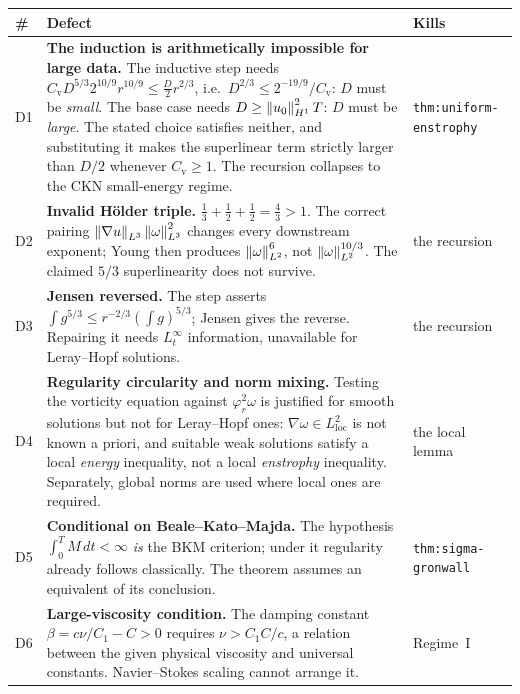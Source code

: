 \begin{table}[ht]
\centering
\footnotesize
\begin{tabular}{@{}l p{} l@{}}
\toprule
\# & Defect & Kills \\
\midrule
D1 & \textbf{The induction is arithmetically impossible for large data.} The
  inductive step needs \(C_{\mathrm v}D^{5/3}2^{10/9}r^{10/9}\le\tfrac D2
  r^{2/3}\), i.e.\ \(D^{2/3}\le2^{-19/9}/C_{\mathrm v}\): \(D\) must be
  \emph{small}. The base case needs \(D\ge\left\|u_0\right\|_{H^1}^2T\): \(D\) must be
  \emph{large}. The stated choice satisfies neither, and substituting it makes
  the superlinear term strictly larger than \(D/2\) whenever
  \(C_{\mathrm v}\ge1\). The recursion collapses to the CKN small-energy
  regime.
  & \texttt{thm:uniform-} \texttt{enstrophy} \\[3pt]
D2 & \textbf{Invalid H\"older triple.} \(\tfrac13+\tfrac12+\tfrac12=\tfrac43>1\).
  The correct pairing \(\left\|\nabla u\right\|_{L^3}\left\|\omega\right\|_{L^3}^2\) changes
  every downstream exponent; Young then produces
  \(\left\|\omega\right\|_{L^2}^6\), not \(\left\|\omega\right\|_{L^2}^{10/3}\). The claimed
  \(5/3\) superlinearity does not survive.
  & the recursion \\[3pt]
D3 & \textbf{Jensen reversed.} The step asserts
  \(\int g^{5/3}\le r^{-2/3}(\int g)^{5/3}\); Jensen gives the reverse.
  Repairing it needs \(L^\infty_t\) information, unavailable for Leray--Hopf
  solutions.
  & the recursion \\[3pt]
D4 & \textbf{Regularity circularity and norm mixing.} Testing the vorticity
  equation against \(\varphi_r^2\omega\) is justified for smooth solutions but
  not for Leray--Hopf ones: \(\nabla\omega\in L^2_{\mathrm{loc}}\) is not known
  a priori, and suitable weak solutions satisfy a local \emph{energy}
  inequality, not a local \emph{enstrophy} inequality. Separately, global
  norms are used where local ones are required.
  & the local lemma \\[3pt]
D5 & \textbf{Conditional on Beale--Kato--Majda.} The hypothesis
  \(\int_0^TM\,dt<\infty\) \emph{is} the BKM criterion; under it regularity
  already follows classically. The theorem assumes an equivalent of its
  conclusion.
  & \texttt{thm:sigma-} \texttt{gronwall} \\[3pt]
D6 & \textbf{Large-viscosity condition.} The damping constant
  \(\beta=c\nu/C_1-C>0\) requires \(\nu>C_1C/c\), a relation between the given
  physical viscosity and universal constants. Navier--Stokes scaling cannot
  arrange it.
  & Regime~I \\[3pt]

\end{tabular}
\end{table}
